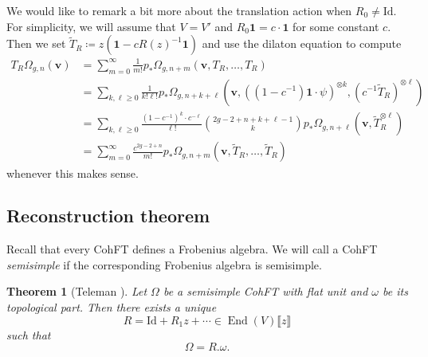 \documentclass{amsart}
\newtheorem{thm}{Theorem}[section]
\theoremstyle{definition}
\theoremstyle{remark}
\theoremstyle{plain}
\theoremstyle{definition}
\theoremstyle{remark}
\newcommand{\mbf}[1]{\mathbf{#1}}
\newcommand{\bv}{\mbf{v}}
\newcommand{\mr}[1]{\mathrm{#1}}
\newcommand{\1}{\mathbf{1}}
\newcommand{\2}{\mathbf{2}}
\newcommand{\3}{\mathbf{3}}
\newcommand{\ps}[1]{\llbracket #1 \rrbracket}
\DeclareMathOperator{\End}{End}
\begin{document}
We would like to remark a bit more about the translation action when $R_0 \neq \mr{Id}$. For simplicity, we will assume that $V = V'$ and $R_0 \1 = c \cdot \1$ for some constant $c$. Then we set $\tilde{T}_R \coloneqq z( \1 - c R(z)^{-1} \1)$ and use the dilaton equation to compute
\begin{align*}
    T_R \Omega_{g,n}(\bv) &= \sum_{m=0}^{\infty} \frac{1}{m!} p_*\Omega_{g,n+m}(\bv, T_R, \ldots, T_R) \\
    &= \sum_{k,\ell \geq 0} \frac{1}{k!\ell!} p_* \Omega_{g,n+k+\ell}(\bv, ( (1-c^{-1})\1 \cdot \psi )^{\otimes k}, ( c^{-1} \tilde{T}_R )^{\otimes \ell}) \\
    &= \sum_{k,\ell \geq 0} \frac{(1-c^{-1})^k \cdot c^{-\ell}}{\ell!} \binom{2g-2+n+k+\ell-1}{k} p_* \Omega_{g,n+\ell}(\bv, \tilde{T}_R^{\otimes \ell}) \\
    &= \sum_{m=0}^{\infty} \frac{c^{2g-2+n}}{m!} p_* \Omega_{g,n+m}(\bv, \tilde{T}_R, \ldots, \tilde{T}_R)
\end{align*}
whenever this makes sense.


\subsection{Reconstruction theorem}%
\label{sub:Reconstruction theorem}

Recall that every CohFT defines a Frobenius algebra. We will call a CohFT \textit{semisimple} if the corresponding Frobenius algebra is semisimple.

\begin{thm}[Teleman {\cite{Teleman2012}}]%
\label{thm:teleman}
    Let $\Omega$ be a semisimple CohFT with flat unit and $\omega$ be its topological part. Then there exists a unique 
    \[ R = \mr{Id} + R_1 z + \cdots \in \End(V)\ps{z} \]
    such that
    \[ \Omega = R.\omega. \]
\end{thm}
\end{document}
